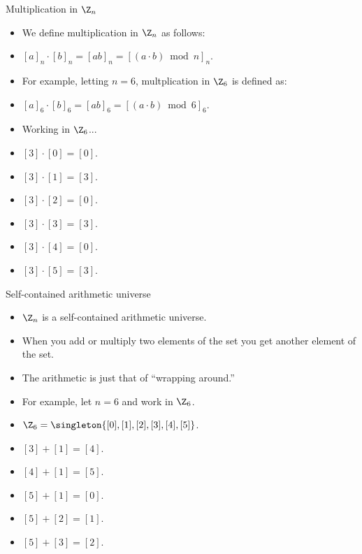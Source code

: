 \documentclass[handout]{beamer}
\begin{document}
\begin{frame}{Multiplication in $\Z_n$}

\begin{itemize}
  \item We define multiplication in $\Z_n$ as follows:
  \item $[a]_n \cdot [b]_n = [ab]_n = [(a\cdot b) \bmod n]_n$.
  \item For example, letting $n=6$, multplication in $\Z_6$ is defined as:
  \item $[a]_6 \cdot [b]_6 = [ab]_6 = [(a\cdot b) \bmod 6]_6$.
  \item Working in $\Z_6$...
  \item $[3] \cdot [0] = [0]$.
  \item $[3] \cdot [1] = [3]$.
  \item $[3] \cdot [2] = [0]$.
  \item $[3] \cdot [3] = [3]$.
  \item $[3] \cdot [4] = [0]$.
  \item $[3] \cdot [5] = [3]$.
\end{itemize}

\end{frame}

\begin{frame}{Self-contained arithmetic universe}

\begin{itemize}
  \item $\Z_n$ is a self-contained arithmetic universe.
  \item When you add or multiply two elements of the set you get another element of the set.
  \item The arithmetic is just that of ``wrapping around.''
  \item For example, let $n=6$ and work in $\Z_6$.
  \item  $\Z_6=\singleton{[0],[1],[2],[3],[4],[5]}$.
  \item $[3] + [1] = [4]$.
  \item $[4] + [1] = [5]$.
  \item $[5] + [1] = [0]$.
  \item $[5] + [2] = [1]$.
  \item $[5] + [3] = [2]$.
\end{itemize}

\end{frame}
\end{document}
